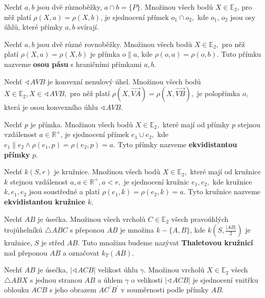\begin{veta}
  Nechť $a,b$ jsou dvě různoběžky, $a\cap b = \{P\}.$ Množinou všech bodů $X\in \mathbb E_2$, pro něž platí $\rho(X,a)=\rho(X,b)$, je sjednocení přímek $o_1\cap o_2,$ kde  $o_1$, $o_2$ jsou osy úhlů, které přímky $a,b$ svírají.
\end{veta}


\begin{definition}
  Nechť $a,b$ jsou dvě různé rovnoběžky. Množinou všech bodů $X\in \mathbb E_2,$ pro něž platí $\rho(X,a)=\rho(X,b)$ je přímka $o\parallel a$, kde $\rho(o,a)=\rho(o,b)$. Tuto přímku nazveme \textbf{osou pásu} s hraničními přímkami $a,b$.
\end{definition}

\begin{veta}
  Nechť $\sphericalangle AVB$ je konvexní nenulový úhel. Množinou všech bodů $X\in \mathbb E_2, X\in \sphericalangle AVB,$ pro něž platí $\rho(X, \overrightarrow{VA})=\rho(X,\overrightarrow{VB}),$ je polopřímka $o$, která je osou konvexního úhlu $\sphericalangle AVB.$
\end{veta}

\begin{definition}
  Nechť $p$ je přímka. Množinou všech bodů $X \in \mathbb E_2,$ které mají od přímky $p$ stejnou vzdálenost $a\in \mathbb R^+$, je sjednocení přímek $e_1\cup e_2,$ kde $e_1 \parallel e_2 \land \rho(e_1,p)=\rho(e_2,p)=a$. Tyto přímky nazveme
  \textbf{ekvidistantou přímky} $p$.
\end{definition}

\begin{definition}
  Nechť $k(S,r)$ je kružnice. Množinou všech bodů $X\in \mathbb E_2,$ které mají od kružnice $k$ stejnou vzdálenost $a, a \in \mathbb R^+, a< r,$ je sjednocení kružnic $e_1, e_2,$ kde kružnice $k,e_1,e_2$ jsou soustředné a platí $\rho(e_1,k)= \rho(e_2,k)=a.$ Tyto kružnice nazveme
  \textbf{ekvidistantou kružnice} $k$.
\end{definition}

\begin{definition}
  Nechť $AB$ je úsečka. Množinou všech vrcholů $C\in \mathbb E_2$ všech pravoúhlých trojúhelníků $\triangle ABC$ s přeponou $AB$ je množina $k-\{ A,B\}$, kde $k\left (S,\frac{|AB|}{2}\right )$ je kružnice, $S$ je střed $AB$. Tuto množinu budeme nazývat \textbf{Thaletovou kružnicí} nad přeponou $AB$ a označovat $k_T(AB).$
\end{definition}

\begin{veta}
  Nechť $AB$ je úsečka, $|\sphericalangle ACB|$ velikost úhlu $\gamma.$ Množinou vrcholů $X\in \mathbb E_2$ všech $\triangle ABX$ s jednou stranou $AB$ a úhlem $\gamma$ o velikosti $|\sphericalangle ACB|$ je sjednocení vnitřku oblouku $ACB$ s jeho obrazem $AC^\prime B^\prime$ v souměrnosti podle přímky $AB$.
\end{veta}

